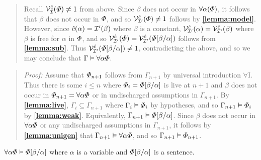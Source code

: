 \begin{quote}
  Recall $\mathcal{V}_{\mathcal{I}}^{\hat{c}}(\varPhi)\neq 1$ from above.
  Since $\beta$ does not occur in $\forall \alpha(\varPhi)$, it follows that $\beta$ does not occur in $\varPhi$, and so $\mathcal{V}_{\mathcal{I}'}^{\hat{c}}(\varPhi)\neq 1$ follows by \textbf{\ref{lemma:model}}.
  However, since $\hat{c}(\alpha)=\mathcal{I}'(\beta)$ where $\beta$ is a constant, $\mathcal{V}_{\mathcal{I}'}^{\hat{c}}(\alpha)=\mathcal{V}_{\mathcal{I}'}^{\hat{c}}(\beta)$ where $\beta$ is free for $\alpha$ in $\varPhi$, and so $\mathcal{V}_{\mathcal{I}'}^{\hat{c}}(\varPhi)=\mathcal{V}_{\mathcal{I}'}^{\hat{c}}(\varPhi[\beta/\alpha])$ follows from \textbf{\ref{lemma:sub}}.
  Thus $\mathcal{V}_{\mathcal{I}'}^{\hat{c}}(\varPhi[\beta/\alpha])\neq 1$, contradicting the above, and so we may conclude that $\Gamma \vDash \forall \alpha\varPhi$.
\end{quote}




\label{rule:UniI}

\begin{quote} 
  \textit{Proof:} Assume that $\varPhi_{n+1}$ follows from $\Gamma_{n+1}$ by universal introduction $\forall$I.
  Thus there is some $i\leq n$ where $\varPhi_i=\varPhi[\beta/\alpha]$ is live at $n+1$ and $\beta$ does not occur in $\varPhi_{n+1}=\forall \alpha\varPhi$ or in undischarged assumptions in $\Gamma_{n+1}$.
  By \textbf{\ref{lemma:live}}, $\Gamma_i\subseteq \Gamma_{n+1}$ where $\Gamma_i\vDash\varPhi_i$ by hypotheses, and so $\Gamma_{n+1} \vDash \varPhi_i$ by \textbf{\ref{lemma:weak}}.
  Equivalently, $\Gamma_{n+1} \vDash \varPhi[\beta/\alpha]$.
  Since $\beta$ does not occur in $\forall \alpha\varPhi$ or any undischarged assumptions in $\Gamma_{n+1}$, it follows by \textbf{\ref{lemma:unigen}} that $\Gamma_{n+1}\vDash \forall \alpha\varPhi$, and so $\Gamma_{n+1}\vDash\varPhi_{n+1}$.
\end{quote}





\begin{Lthm} \label{lemma:uniinst}
  $\forall\alpha\varPhi \vDash \varPhi[\beta/\alpha]$ where $\alpha$ is a variable and $\varPhi[\beta/\alpha]$ is a sentence. 
\end{Lthm}

